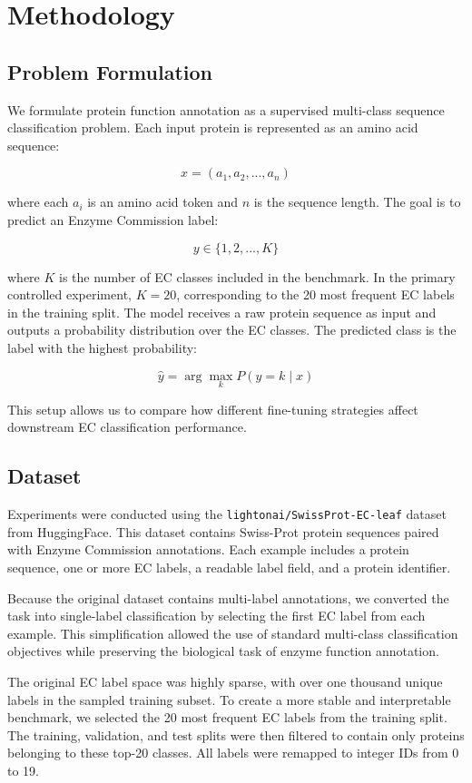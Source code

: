 \documentclass{article}
\begin{document}
\section{Methodology}

\subsection{Problem Formulation}

We formulate protein function annotation as a supervised multi-class sequence classification problem. Each input protein is represented as an amino acid sequence:

\[
x = (a_1, a_2, ..., a_n)
\]

where each \(a_i\) is an amino acid token and \(n\) is the sequence length. The goal is to predict an Enzyme Commission label:

\[
y \in \{1, 2, ..., K\}
\]

where \(K\) is the number of EC classes included in the benchmark. In the primary controlled experiment, \(K = 20\), corresponding to the 20 most frequent EC labels in the training split. The model receives a raw protein sequence as input and outputs a probability distribution over the EC classes. The predicted class is the label with the highest probability:

\[
\hat{y} = \arg\max_k P(y = k \mid x)
\]

This setup allows us to compare how different fine-tuning strategies affect downstream EC classification performance.

\subsection{Dataset}

Experiments were conducted using the \texttt{lightonai/SwissProt-EC-leaf} dataset from HuggingFace. This dataset contains Swiss-Prot protein sequences paired with Enzyme Commission annotations. Each example includes a protein sequence, one or more EC labels, a readable label field, and a protein identifier.

Because the original dataset contains multi-label annotations, we converted the task into single-label classification by selecting the first EC label from each example. This simplification allowed the use of standard multi-class classification objectives while preserving the biological task of enzyme function annotation.

The original EC label space was highly sparse, with over one thousand unique labels in the sampled training subset. To create a more stable and interpretable benchmark, we selected the 20 most frequent EC labels from the training split. The training, validation, and test splits were then filtered to contain only proteins belonging to these top-20 classes. All labels were remapped to integer IDs from 0 to 19.
\end{document}
